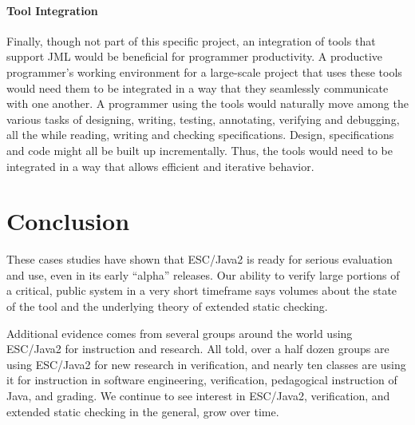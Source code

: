 \documentclass{llncs}
\begin{document}
\paragraph*{Tool Integration} Finally, though not part of this specific
project, an integration of tools that support JML would be beneficial
for programmer productivity.  A productive programmer's working
environment for a large-scale project that uses these tools would need
them to be integrated in a way that they seamlessly communicate
with one another.  A programmer using the tools would naturally move
among the various tasks of designing, writing, testing, annotating,
verifying and debugging, all the while reading, writing and checking
specifications.  Design, specifications and code might all be built up
incrementally.  Thus, the tools would need to be integrated in a way
that allows efficient and iterative behavior.

\section{Conclusion}


These cases studies have shown that ESC/Java2 is ready for serious
evaluation and use, even in its early ``alpha'' releases.  Our ability
to verify large portions of a critical, public system in a very short
timeframe says volumes about the state of the tool and the underlying
theory of extended static checking.  

Additional evidence comes from several groups around the world using
ESC/Java2 for instruction and research.  All told, over a half dozen
groups are using ESC/Java2 for new research in verification, and
nearly ten classes are using it for instruction in software
engineering, verification, pedagogical instruction of Java, and
grading.  We continue to see interest in ESC/Java2, verification,
and extended static checking in the general, grow over time.
\end{document}
